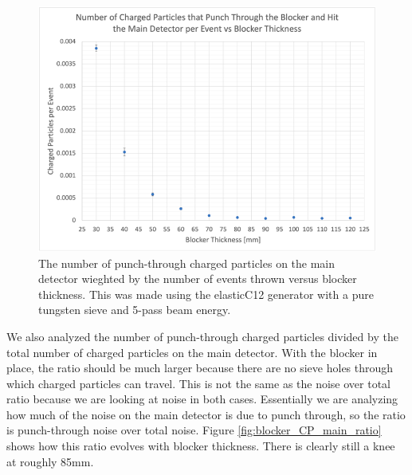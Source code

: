 \begin{figure}[H]
    \centering
    \includegraphics[scale=0.4]{Images/ChargedParticlesPunchThroughMainDet_Blocker_10062021.png}
    \caption{The number of punch-through charged particles on the main detector wieghted by the number of events thrown versus blocker thickness. This was made using the elasticC12 generator with a pure tungsten sieve and 5-pass beam energy.}
    \label{fig:CP_blocker_main}
\end{figure}

We also analyzed the number of punch-through charged particles divided by the total number of charged particles on the main detector. With the blocker in place, the ratio should be much larger because there are no sieve holes through which charged particles can travel. This is not the same as the noise over total ratio because we are looking at noise in both cases. Essentially we are analyzing how much of the noise on the main detector is due to punch through, so the ratio is punch-through noise over total noise. Figure \ref{fig:blocker_CP_main_ratio} shows how this ratio evolves with blocker thickness. There is clearly still a knee at roughly 85mm.

